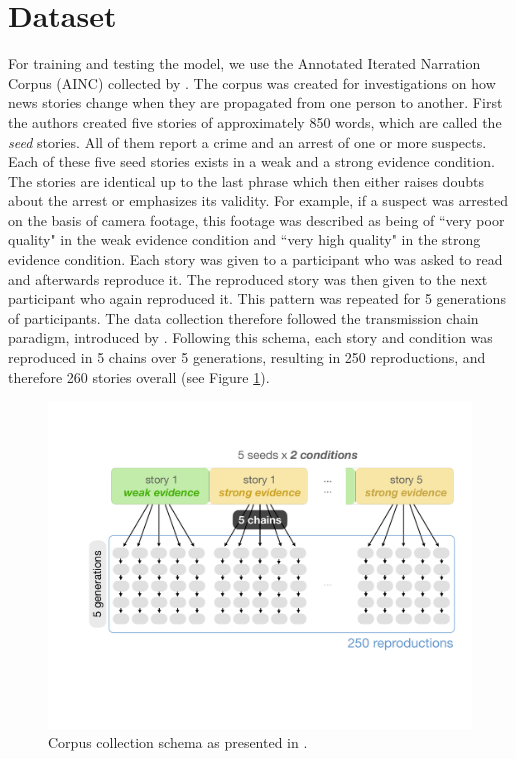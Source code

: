\documentclass[11pt,a4paper]{article}
\begin{document}
\section{Dataset}
For training and testing the model, we use the Annotated Iterated Narration Corpus (AINC) collected by \cite{Kreiss:2019}. The corpus was created for investigations on how news stories change when they are propagated from one person to another. First the authors created five stories of approximately 850 words, which are called the \textit{seed} stories. All of them report a crime and an arrest of one or more suspects. Each of these five seed stories exists in a weak and a strong evidence condition. The stories are identical up to the last phrase which then either raises doubts about the arrest or emphasizes its validity. For example, if a suspect was arrested on the basis of camera footage, this footage was described as being of ``very poor quality" in the weak evidence condition and ``very high quality" in the strong evidence condition. Each story was given to a participant who was asked to read and afterwards reproduce it. The reproduced story was then given to the next participant who again reproduced it. This pattern was repeated for 5 generations of participants. The data collection therefore followed the transmission chain paradigm, introduced by \cite{Bartlett:1932}. Following this schema, each story and condition was reproduced in 5 chains over 5 generations, resulting in 250 reproductions, and therefore 260 stories overall (see Figure \ref{fig:corpus-overview}).

\begin{figure}[t!]
	\includegraphics[width=\linewidth]{graphs/corpus-overview.pdf}
	\caption{Corpus collection schema as presented in \cite{Kreiss:2019}.}
	\label{fig:corpus-overview}
\end{figure}
\end{document}
